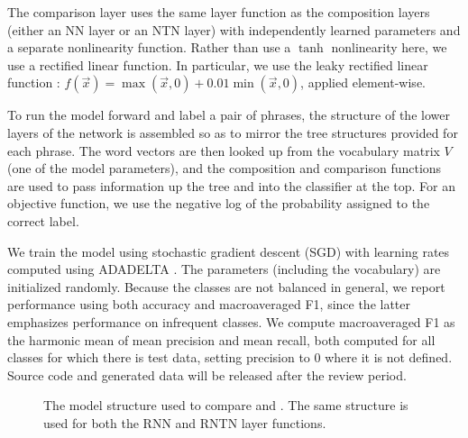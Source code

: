 The comparison layer uses the same layer function as the
composition layers (either an NN layer or an NTN layer) with
independently learned parameters and a separate nonlinearity function.
Rather than use a $\tanh$ nonlinearity here, we use a rectified linear function. In
particular, we use the leaky rectified linear function
: $f(\vec{x})=\max(\vec{x}, 0) +
0.01\min(\vec{x}, 0)$, applied element-wise.

To run the model forward and label a pair of phrases, the structure of
the lower layers of the network is assembled so as to mirror the tree
structures provided for each phrase. The word vectors are then looked
up from the vocabulary matrix $V$ (one of the model parameters), and
the composition and comparison functions are used to pass information
up the tree and into the classifier at the top. For an objective
function, we use the negative log of the probability assigned to the
correct label.

We train the model using stochastic gradient descent (SGD)
with learning rates computed using ADADELTA \cite{zeiler2012adadelta}.
The parameters (including the vocabulary) are initialized randomly.
Because the classes are not balanced in general, we report performance
using both accuracy and macroaveraged F1, since the latter emphasizes
 performance on infrequent classes. We compute macroaveraged F1 
as the harmonic mean of mean precision and mean recall, both computed
for all classes for which there is test data, setting precision to 0 
where it is not defined. Source code and generated data will be released
after the review period.

\begin{figure}[tp]
  \centering
  
  \caption{The model structure used to compare  and . 
    The same structure is used for both the RNN and RNTN layer functions.} 
  \label{sample-figure}
\end{figure}
